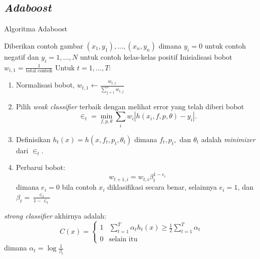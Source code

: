 \subsection{\emph{Adaboost}}

\begin{algorithm}
  \caption{Algoritma Adaboost}
  \begin{algorithmic}[1]
    \State Diberikan contoh gambar $(x_1, y_1), \ldots, (x_n, y_n)$ dimana 
    $y_i = 0$ untuk contoh negatif dan $y_i = 1, \ldots, N$ untuk contoh kelas-kelas positif
    \State Inisialisasi bobot $w_{i,1} = \frac{1}{\text{{total contoh}}}$
    \State Untuk $t = 1, \ldots, T$:
    \begin{enumerate}
      \item Normalisasi bobot, $w_{t,1} \gets \frac{w_{t,1}}{\sum_{j=1}^{n} w_{t,j}}$
      \item Pilih \textit{weak classifier} terbaik dengan melihat error yang telah diberi bobot
      \begin{equation}
        \in_t = \min_{f, p, \theta} \sum_i w_i |h(x_i, f, p, \theta) - y_i|.
      \end{equation}
      \item Definisikan $h_t(x) = h(x, f_t, p_t, \theta_t)$ dimana $f_t, p_t,$ dan $\theta_t$ adalah \textit{minimizer} dari $\in_t$.
      \item Perbarui bobot:
      \begin{equation}
        w_{t+1,i} = w_{t,i} \beta_t^{1 - e_i}
      \end{equation}
      dimana $e_i = 0$ bila contoh $x_i$ diklasifikasi secara benar, selainnya $e_i = 1$, dan $\beta_t = \frac{\in_t}{1 - \in_t}$
    \end{enumerate}
    \State \textit{strong classifier} akhirnya adalah:
    \begin{equation}
      C(x) = \begin{cases}
        1 & \sum_{t=1}^T \alpha_t h_t (x) \geq \frac{1}{2} \sum_{t=1}^T \alpha_t \\
        0 & \text{selain itu}
      \end{cases}
    \end{equation}
    dimana $\alpha_t = \log \frac{1}{\beta_t}$ 
  \end{algorithmic}
\end{algorithm}


